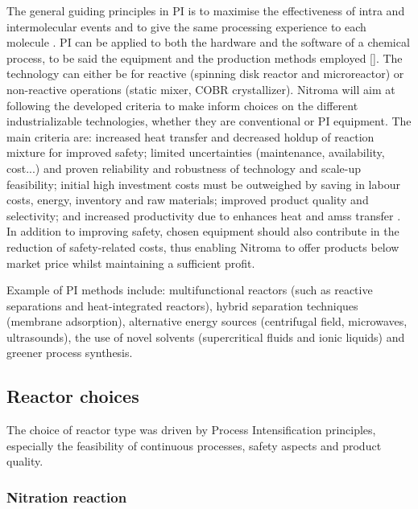 The general guiding principles in PI is to maximise the effectiveness of intra and intermolecular events and to give the same processing experience to each molecule \cite{randall_process_2020}. PI can be applied to both the hardware and the software of a chemical process, to be said the equipment and the production methods employed []. The technology can either be for reactive (spinning disk reactor and microreactor) or non-reactive operations (static mixer, COBR crystallizer). Nitroma will aim at following the developed criteria to make inform choices on the different industrializable technologies, whether they are conventional or PI equipment. The main criteria are: increased heat transfer and decreased holdup of reaction mixture for improved safety; limited uncertainties (maintenance, availability, cost...) and proven reliability and robustness of technology and scale-up feasibility; initial high investment costs must be outweighed by saving in labour costs, energy, inventory and raw materials; improved product quality and selectivity; and increased productivity due to enhances heat and amss transfer \cite{randall_process_2020}. In addition to improving safety, chosen equipment should also contribute in the reduction of safety-related costs, thus enabling Nitroma to offer products below market price whilst maintaining a sufficient profit.

Example of PI methods include: multifunctional reactors (such as reactive separations and heat-integrated reactors), hybrid separation techniques (membrane adsorption), alternative energy sources (centrifugal field, microwaves, ultrasounds), the use of novel solvents (supercritical fluids and ionic liquids) and greener process synthesis.






\subsection{Reactor choices}

The choice of reactor type was driven by Process Intensification principles, especially the feasibility of continuous processes, safety aspects and product quality. 

\subsubsection{Nitration reaction}

